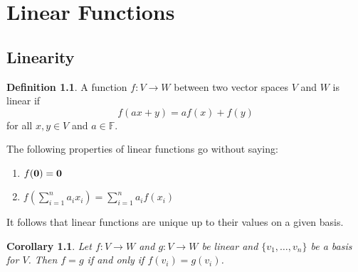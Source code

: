 \documentclass[oneside, 12pt]{book}
\newtheorem{cor}{Corollary}[section]
\theoremstyle{definition}
\newtheorem{defn}{Definition}[section]
\begin{document}
\chapter{Linear Functions}
\section{Linearity}
\begin{defn}
\label{defn_lin}
  A function $f: V \to W$ between two vector spaces $V$ and $W$ is linear if
  \[f(ax+y)=af(x)+f(y)\] for all $x, y \in V$ and $a \in \mathbb{F}$.
\end{defn}
The following properties of linear functions go without saying:
\begin{enumerate}
  \item $f(\bold{0})=\bold{0}$
  \item $f(\sum_{i=1}^{n}a_{i}x_{i})=\sum_{i=1}^{n}a_{i}f(x_{i})$
\end{enumerate}
It follows that linear functions are unique up to their values on a given basis.
\begin{cor}
\label{cor_linbas}
  Let $f:V \to W$ and $g: V \to W$ be linear and $\{v_{1}, \dots, v_{n}\}$ be a basis for $V$. Then $f=g$ if and only if $f(v_{i})=g(v_{i})$.
\end{cor}
\end{document}

